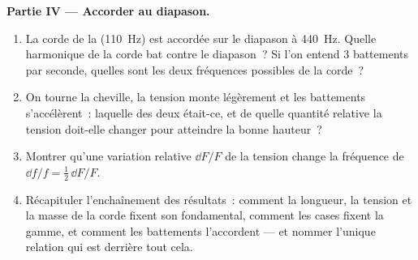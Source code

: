 \begin{problem}
\medskip
\noindent\textbf{Partie IV --- Accorder au diapason.}
\begin{enumerate}[resume]
  \item La corde de la (\qty{110}{Hz}) est accordée sur le diapason à
        \qty{440}{Hz}. Quelle harmonique de la corde bat contre le
        diapason~? Si l'on entend \qty{3}{} battements par seconde,
        quelles sont les deux fréquences possibles de la corde~?
  \item On tourne la cheville, la tension monte légèrement et les
        battements s'accélèrent~: laquelle des deux était-ce, et de
        quelle quantité relative la tension doit-elle changer pour
        atteindre la bonne hauteur~?
  \item Montrer qu'une variation relative $\dd F/F$ de la tension change
        la fréquence de $\dd f/f = \tfrac12\,\dd F/F$.
  \item Récapituler l'enchaînement des résultats~: comment la longueur,
        la tension et la masse de la corde fixent son fondamental,
        comment les cases fixent la gamme, et comment les battements
        l'accordent --- et nommer l'unique relation qui est derrière tout cela.
\end{enumerate}
\end{problem}
